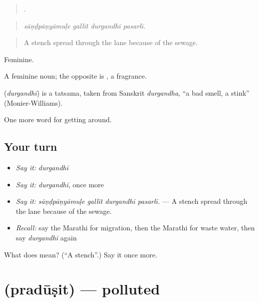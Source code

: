 \begin{quote}
   .
\end{quote}

\begin{quote}
\emph{sāṇḍpāṇyāmuḷe gallīt durgandhī pasarlī.}
\end{quote}

\begin{quote}
A stench spread through the lane because of the sewage.
\end{quote}

Feminine.

A feminine noun; the opposite is , a fragrance.

\begin{cousinweb}
\textbf{} (\emph{durgandhī}) is a tatsama, taken from Sanskrit \emph{durgandha}, \textquotedblleft{}a bad smell, a stink\textquotedblright{} (Monier-Williams).
\end{cousinweb}

\begin{grammarlens}[title={What you've built}]
One more word for getting around.
\end{grammarlens}

\subsection*{Your turn}
\begin{itemize}
\raggedright
  \item \emph{Say it:} \emph{durgandhī}
  \item \emph{Say it:} \emph{durgandhī}, once more
  \item \emph{Say it:} \emph{sāṇḍpāṇyāmuḷe gallīt durgandhī pasarlī.} — A stench spread through the lane because of the sewage.
  \item \emph{Recall:} say the Marathi for migration, then the Marathi for waste water, then say \emph{durgandhī} again
\end{itemize}

\begin{tcolorbox}[breakable,colback=teal!4,colframe=teal!35!black,title={Before you move on}]
What does  mean? (\textquotedblleft{}A stench\textquotedblright{}.) Say it once more.
\end{tcolorbox}
\section[\texorpdfstring{\mr{प्रदूषित} (pradūṣit)}{प्रदूषित (pradūṣit)}]{ (pradūṣit) — polluted}

